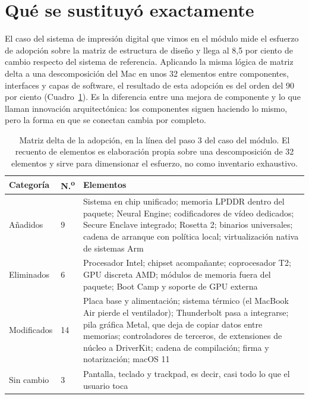\documentclass[11pt,letterpaper]{article}
\begin{document}
\section{Qué se sustituyó exactamente}

El caso del sistema de impresión digital que vimos en el módulo mide el
esfuerzo de adopción sobre la matriz de estructura de diseño y llega al 8,5
por ciento de cambio respecto del sistema de referencia. Aplicando la misma
lógica de matriz delta a una descomposición del Mac en unos 32 elementos entre
componentes, interfaces y capas de software, el resultado de esta adopción es
del orden del 90 por ciento (Cuadro~\ref{cuadro:delta}). Es la diferencia
entre una mejora de componente y lo que \textcite{henderson1990} llaman
innovación arquitectónica: los componentes siguen haciendo lo mismo, pero la
forma en que se conectan cambia por completo.

\begin{table}[H]
\small
\caption{Matriz delta de la adopción, en la línea del paso 3 del caso del
módulo. El recuento de elementos es elaboración propia sobre una
descomposición de 32 elementos y sirve para dimensionar el esfuerzo, no como
inventario exhaustivo.}
\label{cuadro:delta}
\begin{tabularx}{\textwidth}{@{}p{2.55cm}p{1.15cm}X@{}}
\toprule
\textbf{Categoría} & \textbf{N.\textsuperscript{o}} & \textbf{Elementos} \\
\midrule
Añadidos & 9
& Sistema en chip unificado; memoria LPDDR dentro del paquete; Neural Engine;
  codificadores de vídeo dedicados; Secure Enclave integrado; Rosetta 2;
  binarios universales; cadena de arranque con política local; virtualización
  nativa de sistemas Arm \\
\addlinespace[2pt]
Eliminados & 6
& Procesador Intel; chipset acompañante; coprocesador T2; GPU discreta AMD;
  módulos de memoria fuera del paquete; Boot Camp y soporte de GPU externa \\
\addlinespace[2pt]
Modificados & 14
& Placa base y alimentación; sistema térmico (el MacBook Air pierde el
  ventilador); Thunderbolt pasa a integrarse; pila gráfica Metal, que deja de
  copiar datos entre memorias; controladores de terceros, de extensiones de
  núcleo a DriverKit; cadena de compilación; firma y notarización; macOS 11 \\
\addlinespace[2pt]
Sin cambio & 3
& Pantalla, teclado y trackpad, es decir, casi todo lo que el usuario toca \\
\bottomrule
\end{tabularx}
\end{table}
\end{document}
